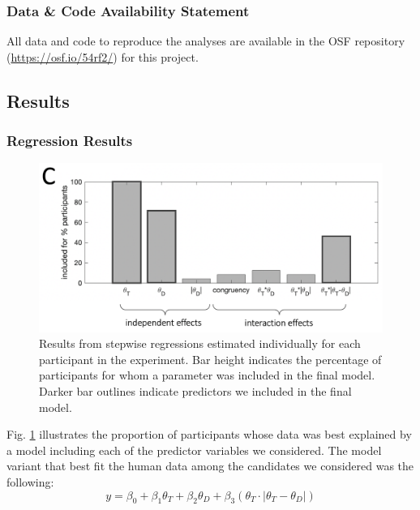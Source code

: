 \documentclass[a4paper, nobind]{templates/ociamthesis}
\begin{document}
\hypertarget{data-code-availability-statement-1}{%
\subsubsection{Data \& Code Availability Statement}\label{data-code-availability-statement-1}}

All data and code to reproduce the analyses are available in the OSF repository (\url{https://osf.io/54rf2/}) for this project.

\hypertarget{results-3}{%
\subsection{Results}\label{results-3}}

\hypertarget{regression-results}{%
\subsubsection{Regression Results}\label{regression-results}}

\begin{figure}

{\centering \includegraphics[width=0.8\linewidth]{figures/distr-stepwise-a} 

}

\caption[Experiment 1, Stepwise regression results]{Results from stepwise regressions estimated individually for each participant in the experiment. Bar height indicates the percentage of participants for whom a parameter was included in the final model. Darker bar outlines indicate predictors we included in the final model.}\label{fig:distr-stepwise-a}
\end{figure}

Fig. \ref{fig:distr-stepwise-a} illustrates the proportion of participants whose data was best explained by a model including each of the predictor variables we considered. The model variant that best fit the human data among the candidates we considered was the following:
\begin{equation}
y = \beta_0 + \beta_1\theta_T + \beta_2\theta_D + \beta_3(\theta_T\cdot|\theta_T-\theta_D|)
\label{eq:reg-stepwise}
\end{equation}
\end{document}
